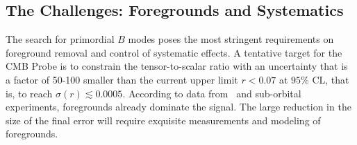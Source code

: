 

\subsection{The Challenges: Foregrounds and Systematics}
\label{sec:foregrounds_systematics}

\vspace{-0.05in}
The search for primordial $B$ modes poses the most stringent requirements on foreground removal and control of systematic effects. A tentative target for the CMB Probe is to constrain the tensor-to-scalar ratio with an 
uncertainty that is a factor of 50-100 smaller than the current upper limit \mbox{$r < 0.07$} at $95\%$ CL, that is, to reach 
$\sigma(r)\lesssim0.0005$. According to data from \planck\ and 
sub-orbital experiments, foregrounds already dominate the signal. The large reduction in the size of 
the final error will require exquisite measurements and modeling of foregrounds. 
